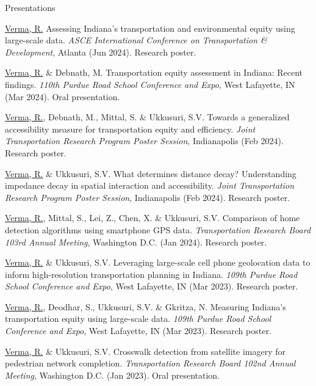 \documentclass{CV} %
\begin{document}
\begin{rSection}{Presentations}
    \begin{etaremune}
        \item \underline{Verma, R.} Assessing Indiana's transportation and environmental equity using large-scale data. \textit{ASCE International Conference on Transportation \& Development}, Atlanta (Jun 2024). Research poster.

        \item \underline{Verma, R.} \& Debnath, M. Transportation equity assessment in Indiana: Recent findings. \textit{110th Purdue Road School Conference and Expo}, West Lafayette, IN (Mar 2024). Oral presentation.
        
        \item \underline{Verma, R.}, Debnath, M., Mittal, S. \& Ukkusuri, S.V. Towards a generalized accessibility measure for transportation equity and efficiency. \textit{Joint Transportation Research Program Poster Session}, Indianapolis (Feb 2024). Research poster.
        
        \item \underline{Verma, R.} \& Ukkusuri, S.V. What determines distance decay? Understanding impedance decay in spatial interaction and accessibility. \textit{Joint Transportation Research Program Poster Session}, Indianapolis (Feb 2024). Research poster.

        \item \underline{Verma, R.}, Mittal, S., Lei, Z., Chen, X. \& Ukkusuri, S.V. Comparison of home detection algorithms using smartphone GPS data. \textit{Transportation Research Board 103rd Annual Meeting}, Washington D.C. (Jan 2024). Research poster.

        \item \underline{Verma, R.} \& Ukkusuri, S.V. Leveraging large-scale cell phone geolocation data to inform high-resolution transportation planning in Indiana. \textit{109th Purdue Road School Conference and Expo}, West Lafayette, IN (Mar 2023). Research poster.

        \item \underline{Verma, R.}, Deodhar, S., Ukkusuri, S.V. \& Gkritza, N. Measuring Indiana's transportation equity using large-scale data. \textit{109th Purdue Road School Conference and Expo}, West Lafayette, IN (Mar 2023). Research poster.

        \item \underline{Verma, R.} \& Ukkusuri, S.V. Crosswalk detection from satellite imagery for pedestrian network completion. \textit{Transportation Research Board 102nd Annual Meeting}, Washington D.C. (Jan 2023). Oral presentation.


\end{etaremune}
\end{rSection}
\end{document}
